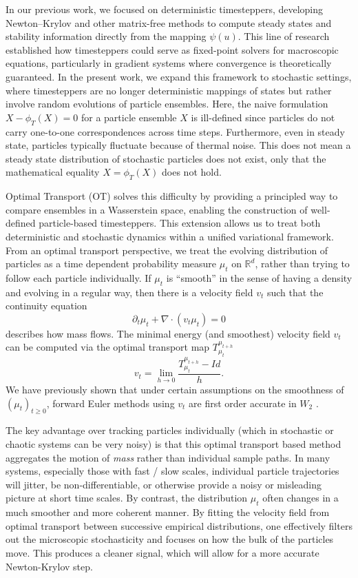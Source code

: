 \documentclass{article}
\begin{document}
In our previous work, we focused on deterministic timesteppers, developing Newton–Krylov and other matrix-free methods to compute steady states and stability information directly from the mapping $\psi(u)$. This line of research established how timesteppers could serve as fixed-point solvers for macroscopic equations, particularly in gradient systems where convergence is theoretically guaranteed. In the present work, we expand this framework to stochastic settings, where timesteppers are no longer deterministic mappings of states but rather involve random evolutions of particle ensembles. Here, the naive formulation $X - \phi_{T}(X) = 0$ for a particle ensemble $X$ is ill-defined since particles do not carry one-to-one correspondences across time steps. Furthermore, even in steady state, particles typically fluctuate because of thermal noise. This does not mean a steady state distribution of stochastic particles does not exist, only that the mathematical equality $X = \phi_T(X)$ does not hold.

Optimal Transport (OT) solves this difficulty by providing a principled way to compare ensembles in a Wasserstein space, enabling the construction of well-defined particle-based timesteppers. This extension allows us to treat both deterministic and stochastic dynamics within a unified variational framework. From an optimal transport perspective, we treat the evolving distribution of particles as a time dependent probability measure $\mu_t$ on $\mathbb{R}^d$, rather than trying to follow each particle individually. If $\mu_t$ is ``smooth'' in the sense of having a density and evolving in a regular way, then there is a velocity field $v_t$ such that the continuity equation
\begin{equation} \label{eq:OTcontinuity}
\partial_t \mu_t + \nabla \cdot (v_t \mu_t) = 0
\end{equation}
describes how mass flows. The minimal energy (and smoothest) velocity field $v_t$ can be computed via the optimal transport map $T_{\mu_t}^{\mu_{t+h}}$
\[v_t = \lim_{h\to 0}\frac{T_{\mu_t}^{\mu_{t+h}} - Id}{h}.\]
We have previously shown that under certain assumptions on the smoothness of $(\mu_t)_{t\ge 0}$, forward Euler methods using $v_t$ are first order accurate in $W_2$ \cite{karris2024using}.

The key advantage over tracking particles individually (which in stochastic or chaotic systems can be very noisy) is that this optimal transport based method aggregates the motion of \emph{mass} rather than individual sample paths. In many systems, especially those with fast / slow scales, individual particle trajectories will jitter, be non-differentiable, or otherwise provide a noisy or misleading picture at short time scales. By contrast, the distribution $\mu_t$ often changes in a much smoother and more coherent manner. By fitting the velocity field from optimal transport between successive empirical distributions, one effectively filters out the microscopic stochasticity and focuses on how the bulk of the particles move. This produces a cleaner signal, which will allow for a more accurate Newton-Krylov step.
\end{document}
